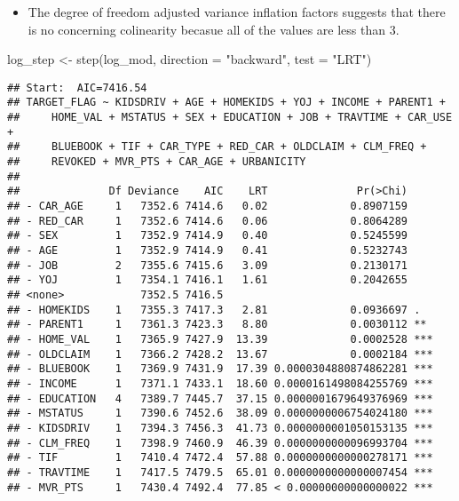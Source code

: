 \documentclass[
]{article}
\newenvironment{Shaded}{\begin{snugshade}}{\end{snugshade}}
\newcommand{\AttributeTok}[1]{\textcolor[rgb]{0.77,0.63,0.00}{#1}}
\newcommand{\FunctionTok}[1]{\textcolor[rgb]{0.00,0.00,0.00}{#1}}
\newcommand{\NormalTok}[1]{#1}
\newcommand{\OtherTok}[1]{\textcolor[rgb]{0.56,0.35,0.01}{#1}}
\newcommand{\StringTok}[1]{\textcolor[rgb]{0.31,0.60,0.02}{#1}}
\providecommand{\tightlist}{%
  \setlength{\itemsep}{0pt}\setlength{\parskip}{0pt}}
\begin{document}
\begin{itemize}
\tightlist
\item
  The degree of freedom adjusted variance inflation factors suggests
  that there is no concerning colinearity becasue all of the values are
  less than 3.
\end{itemize}

\begin{Shaded}
\begin{Highlighting}[]
\NormalTok{log\_step }\OtherTok{\textless{}{-}} \FunctionTok{step}\NormalTok{(log\_mod, }\AttributeTok{direction =} \StringTok{"backward"}\NormalTok{, }\AttributeTok{test =} \StringTok{"LRT"}\NormalTok{)}
\end{Highlighting}
\end{Shaded}

\begin{verbatim}
## Start:  AIC=7416.54
## TARGET_FLAG ~ KIDSDRIV + AGE + HOMEKIDS + YOJ + INCOME + PARENT1 + 
##     HOME_VAL + MSTATUS + SEX + EDUCATION + JOB + TRAVTIME + CAR_USE + 
##     BLUEBOOK + TIF + CAR_TYPE + RED_CAR + OLDCLAIM + CLM_FREQ + 
##     REVOKED + MVR_PTS + CAR_AGE + URBANICITY
## 
##              Df Deviance    AIC    LRT              Pr(>Chi)    
## - CAR_AGE     1   7352.6 7414.6   0.02             0.8907159    
## - RED_CAR     1   7352.6 7414.6   0.06             0.8064289    
## - SEX         1   7352.9 7414.9   0.40             0.5245599    
## - AGE         1   7352.9 7414.9   0.41             0.5232743    
## - JOB         2   7355.6 7415.6   3.09             0.2130171    
## - YOJ         1   7354.1 7416.1   1.61             0.2042655    
## <none>            7352.5 7416.5                                 
## - HOMEKIDS    1   7355.3 7417.3   2.81             0.0936697 .  
## - PARENT1     1   7361.3 7423.3   8.80             0.0030112 ** 
## - HOME_VAL    1   7365.9 7427.9  13.39             0.0002528 ***
## - OLDCLAIM    1   7366.2 7428.2  13.67             0.0002184 ***
## - BLUEBOOK    1   7369.9 7431.9  17.39 0.0000304880874862281 ***
## - INCOME      1   7371.1 7433.1  18.60 0.0000161498084255769 ***
## - EDUCATION   4   7389.7 7445.7  37.15 0.0000001679649376969 ***
## - MSTATUS     1   7390.6 7452.6  38.09 0.0000000006754024180 ***
## - KIDSDRIV    1   7394.3 7456.3  41.73 0.0000000001050153135 ***
## - CLM_FREQ    1   7398.9 7460.9  46.39 0.0000000000096993704 ***
## - TIF         1   7410.4 7472.4  57.88 0.0000000000000278171 ***
## - TRAVTIME    1   7417.5 7479.5  65.01 0.0000000000000007454 ***
## - MVR_PTS     1   7430.4 7492.4  77.85 < 0.00000000000000022 ***

\end{verbatim}
\end{document}
